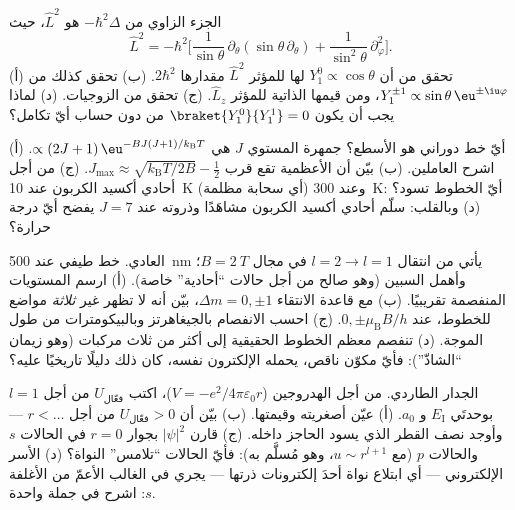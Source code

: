 \begin{exercise}[$\star\star$]\label{exo:b3:quantum-angular-momentum:5}
الجزء الزاوي من $-\hbar^2\Delta$ هو $\hat L^2$، حيث
\[
\hat L^2 = -\hbar^2\Big[\frac{1}{\sin\theta}\,\partial_\theta
(\sin\theta\,\partial_\theta) +
\frac{1}{\sin^2\theta}\,\partial_\varphi^2\Big] .
\]
(أ) تحقق من أن $Y_1^0 \propto \cos\theta$ لها  للمؤثر $\hat L^2$
مقدارها $2\hbar^2$. (ب) تحقق كذلك من $Y_1^{\pm1} \propto \sin\theta\,
\eu^{\pm\iu\varphi}$، ومن قيمها الذاتية للمؤثر $\hat L_z$. (ج)
تحقق من الزوجيات. (د) لماذا يجب أن يكون $\braket{Y_1^0}{Y_1^1} = 0$ من دون
حساب أيّ تكامل؟
\end{exercise}

\begin{exercise}[$\star\star$]\label{exo:b3:quantum-angular-momentum:6}
أيّ خط دوراني هو الأسطع؟ جمهرة المستوي $J$ هي
$\propto (2J+1)\,\eu^{-BJ(J+1)/k_{\text{B}}T}$. (أ) اشرح العاملين.
(ب) بيّن أن الأعظمية تقع قرب $J_{\max} \approx
\sqrt{k_{\text{B}}T/2B} - \tfrac12$. (ج) من أجل أحادي أكسيد الكربون عند \qty{10}{K}
(أي سحابة مظلمة) وعند \qty{300}{K}: أيّ الخطوط تسود؟ (د)
وبالقلب: سلّم أحادي أكسيد الكربون مشاهَدًا وذروته عند $J = 7$ يفضح أيّ
درجة حرارة؟
\end{exercise}

\begin{exercise}[$\star\star$]\label{exo:b3:quantum-angular-momentum:7}
 العادي. خط طيفي عند \qty{500}{nm} يأتي من
انتقال $l = 2 \to l = 1$ في مجال $B = \qty{2}{T}$؛ وأهمل
السبين (وهو صالح من أجل حالات ``أحادية'' خاصة). (أ) ارسم المستويات
المنفصمة تقريبيًا. (ب) مع قاعدة الانتقاء $\Delta m = 0, \pm1$، بيّن أنه لا تظهر
غير \emph{ثلاثة} مواضع للخطوط، عند $0, \pm\mu_{\text{B}}B/h$.
(ج) احسب الانفصام بالجيغاهرتز وبالبيكومترات من طول الموجة.
(د) تنفصم معظم الخطوط الحقيقية إلى أكثر من ثلاث مركبات
(وهو زيمان ``الشاذّ''): فأيّ مكوّن ناقص، يحمله
الإلكترون نفسه، كان ذلك دليلًا تاريخيًا عليه؟
\end{exercise}

\begin{exercise}[$\star\star$]\label{exo:b3:quantum-angular-momentum:8}
الجدار الطاردي. من أجل الهدروجين ($V = -e^2/4\pi\varepsilon_0r$)،
اكتب $U_{\text{فعّال}}$ من أجل $l = 1$ بوحدتَي $E_{\text{I}}$ و
$a_0$. (أ) عيّن أصغريته وقيمتها. (ب) بيّن أن $U_{\text{فعّال}} >
0$ من أجل $r < \dots$ --- وأوجد نصف القطر الذي يسود الحاجز
داخله. (ج) قارن $|\psi|^2$ بجوار $r = 0$ في الحالات $s$ والحالات $p$
(مع $u \sim r^{l+1}$، وهو مُسلَّم به): فأيّ الحالات ``تلامس''
النواة؟ (د) الأسر الإلكتروني --- أي ابتلاع نواة أحدَ
إلكترونات ذرتها --- يجري في الغالب الأعمّ من الأغلفة $s$:
اشرح في جملة واحدة.
\end{exercise}

